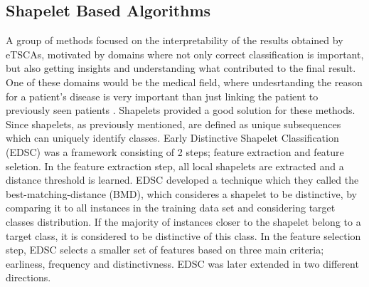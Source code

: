 \subsection{Shapelet Based Algorithms}
\label{SubsectionETSCAShapelets}
A group of methods \cite{xing2011extracting,ghalwash2012early,ghalwash2014utilizing,he2015early} focused on the interpretability of the results obtained by eTSCAs,
motivated by domains where not only correct classification is important, but also getting insights and understanding what contributed to the final result.
One of these domains would be the medical field, where undesrtanding the reason for a patient's disease is very important than just linking the patient to previously seen patients \cite{xing2011extracting}.
Shapelets provided a good solution for these methods. Since shapelets, as previously mentioned, are defined as unique subsequences which can uniquely identify classes.
Early Distinctive Shapelet Classification (EDSC) was a framework consisting of 2 steps; feature extraction and feature seletion.
In the feature extraction step, all local shapelets are extracted and a distance threshold is learned. EDSC developed a technique which they called the best-matching-distance (BMD),
which consideres a shapelet to be distinctive, by comparing it to all instances in the training data set and considering target classes distribution.
If the majority of instances closer to the shapelet belong to a target class, it is considered to be distinctive of this class.
In the feature selection step, EDSC selects a smaller set of features based on three main criteria; earliness, frequency and distinctivness.
EDSC was later extended in two different directions.

